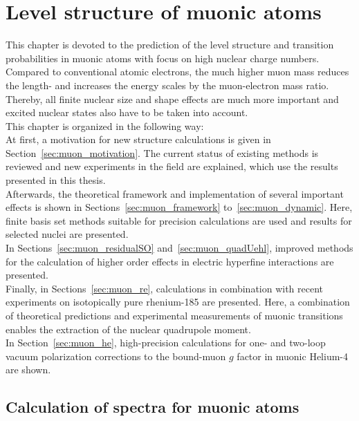 \chapter{Level structure of muonic atoms}
\label{ch:muonic_atoms}
This chapter is devoted to the prediction of the level structure and transition probabilities in muonic atoms with focus on high nuclear charge numbers. Compared to conventional atomic electrons, the much higher muon mass reduces the length- and  increases the energy scales by the muon-electron mass ratio. Thereby, all finite nuclear size and shape effects are much more important and excited nuclear states also have to be taken into account.\\
This chapter is organized in the following way:\\
At first, a motivation for new structure calculations is given in Section~\ref{sec:muon_motivation}. The current status of existing methods is reviewed and new experiments in the field are explained, which use the results presented in this thesis.\\
Afterwards, the theoretical framework and implementation of several important effects is shown in Sections~\ref{sec:muon_framework} to~\ref{sec:muon_dynamic}. Here, finite basis set methods suitable for precision calculations are used and results for selected nuclei are presented.\\
In Sections~\ref{sec:muon_residualSO} and~\ref{sec:muon_quadUehl}, improved methods for the calculation of higher order effects in electric hyperfine interactions are presented.\\
Finally, in Sections~\ref{sec:muon_re}, calculations in combination with recent experiments on isotopically pure rhenium-185 are presented. Here, a combination of theoretical predictions and experimental measurements of muonic transitions enables the extraction of the nuclear quadrupole moment. \\
In Section~\ref{sec:muon_he}, high-precision calculations for one- and two-loop vacuum polarization corrections to the bound-muon $g$ factor in muonic Helium-4 are shown.

\section{Calculation of spectra for muonic atoms}
\label{sec:calculationSpectraMuon}
